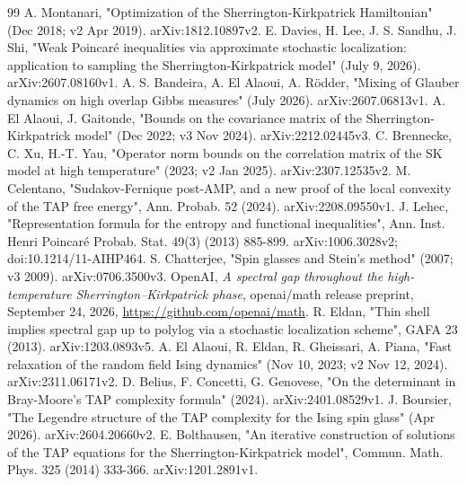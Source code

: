 \documentclass[11pt]{article}
\begin{document}
\begin{thebibliography}{99}
 A. Montanari, "Optimization of the Sherrington-Kirkpatrick Hamiltonian" (Dec 2018; v2 Apr 2019). arXiv:1812.10897v2.
 E. Davies, H. Lee, J. S. Sandhu, J. Shi, "Weak Poincaré inequalities via approximate stochastic localization: application to sampling the Sherrington-Kirkpatrick model" (July 9, 2026). arXiv:2607.08160v1.
 A. S. Bandeira, A. El Alaoui, A. Rödder, "Mixing of Glauber dynamics on high overlap Gibbs measures" (July 2026). arXiv:2607.06813v1.
 A. El Alaoui, J. Gaitonde, "Bounds on the covariance matrix of the Sherrington-Kirkpatrick model" (Dec 2022; v3 Nov 2024). arXiv:2212.02445v3.
 C. Brennecke, C. Xu, H.-T. Yau, "Operator norm bounds on the correlation matrix of the SK model at high temperature" (2023; v2 Jan 2025). arXiv:2307.12535v2.
 M. Celentano, "Sudakov-Fernique post-AMP, and a new proof of the local convexity of the TAP free energy", Ann. Probab. 52 (2024). arXiv:2208.09550v1.
 J. Lehec, "Representation formula for the entropy and functional inequalities", Ann. Inst. Henri Poincaré Probab. Stat. 49(3) (2013) 885-899. arXiv:1006.3028v2; doi:10.1214/11-AIHP464.
 S. Chatterjee, "Spin glasses and Stein's method" (2007; v3 2009). arXiv:0706.3500v3.
 OpenAI, \emph{A spectral gap throughout the high-temperature Sherrington--Kirkpatrick phase}, openai/math release preprint, September 24, 2026, \url{https://github.com/openai/math}.
 R. Eldan, "Thin shell implies spectral gap up to polylog via a stochastic localization scheme", GAFA 23 (2013). arXiv:1203.0893v5.
 A. El Alaoui, R. Eldan, R. Gheissari, A. Piana, "Fast relaxation of the random field Ising dynamics" (Nov 10, 2023; v2 Nov 12, 2024). arXiv:2311.06171v2.
 D. Belius, F. Concetti, G. Genovese, "On the determinant in Bray-Moore's TAP complexity formula" (2024). arXiv:2401.08529v1.
 J. Boursier, "The Legendre structure of the TAP complexity for the Ising spin glass" (Apr 2026). arXiv:2604.20660v2.
 E. Bolthausen, "An iterative construction of solutions of the TAP equations for the Sherrington-Kirkpatrick model", Commun. Math. Phys. 325 (2014) 333-366. arXiv:1201.2891v1.

\end{thebibliography}
\end{document}
